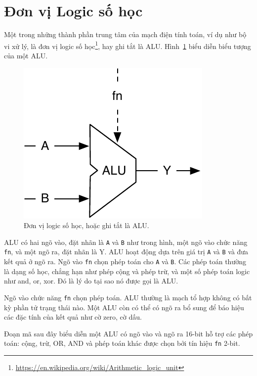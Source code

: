 \documentclass[%
    10pt,
    headinclude, footexclude,
    openright, %
    notitlepage,
    cleardoubleempty,
    headsepline,
    pointlessnumbers,
    bibtotoc, idxtotoc,
    ]{scrbook}
\newcommand{\code}[1]{{\small{\texttt{#1}}}}
\newcommand{\scale}{0.7}
\newcommand{\myref}[2]{\href{#1}{#2}}
\renewcommand{\myref}[2]{{#2}{\footnote{\url{#1}}}}
\begin{document}
\section{Đơn vị Logic số học}

Một trong những thành phần trung tâm của mạch điện tính toán, ví dụ như bộ vi xử lý, là
\myref{https://en.wikipedia.org/wiki/Arithmetic_logic_unit}{đơn vị logic số học},
hay ghi tắt là ALU. Hình~\ref{fig:alu} biểu diễn biểu tượng của một ALU.


\begin{figure}
  \centering
  \includegraphics[scale=\scale]{figures/alu}
  \caption{Đơn vị logic số học, hoặc ghi tắt là ALU.}
  \label{fig:alu}
\end{figure}

ALU có hai ngõ vào, đặt nhãn là \code{A} và \code{B} như trong hình, một ngõ vào chức năng \code{fn},
và một ngõ ra, đặt nhãn là {Y}. ALU hoạt động dựa trên giá trị \code{A} và \code{B} và đưa kết quả ở ngõ ra. 
Ngõ vào \code{fn} chọn phép toán cho \code{A} và \code{B}.
Các phép toán thường là dạng số học, chẳng hạn như phép cộng và phép trừ, và một số phép toán
logic như and, or, xor. Đó là lý do tại sao nó được gọi là ALU.

Ngõ vào chức năng \code{fn} chọn phép toán. ALU thường là mạch tổ hợp không có bất kỳ phần tử trạng thái nào.
Một ALU còn có thể có ngõ ra bổ sung để báo hiệu các đặc tính của kết quả như cờ zero, cờ dấu.

Đoạn mã sau đây biểu diễn một ALU có ngõ vào và ngõ ra 16-bit hỗ trợ các phép toán: cộng, trừ, OR, AND và 
phép toán khác được chọn bởi tín hiệu \code{fn} 2-bit.

\end{document}
